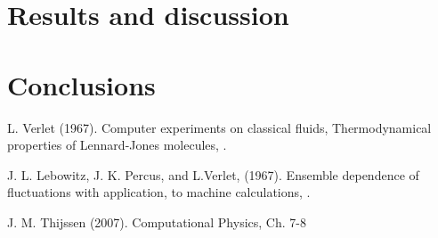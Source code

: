 \documentclass[twoside]{article}
\begin{document}
\section{Results and discussion}
\lipsum[5-6]
	
\section{Conclusions}
\lipsum[7]

\begin{thebibliography}{1}
	L.   Verlet  (1967). 
	\newblock Computer  experiments   on   classical   fluids, 
	\newblock Thermodynamical properties of Lennard-Jones molecules,
	.
	
	J. L. Lebowitz, J. K. Percus, and L.Verlet, (1967).
	\newblock Ensemble dependence of fluctuations with application,
	to machine calculations,
	.
	
	J. M. Thijssen (2007).
	\newblock Computational Physics, Ch. 7-8
	
\end{thebibliography}
	
\end{document}
